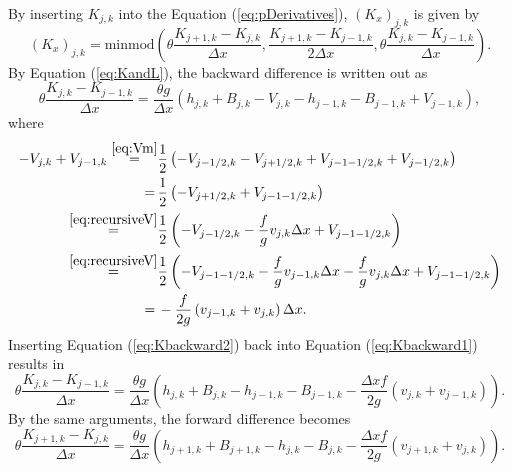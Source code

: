 \documentclass[11pt, a4paper]{article}
\newcommand{\dx}[0]{\Delta x}
\newcommand{\eref}[1]{Equation (\ref{eq:#1})}
\begin{document}
By inserting $K_{j,k}$ into the \eref{pDerivatives}, $(K_x)_{j,k}$ is given by
\begin{equation}
	\left( K_x \right)_{j,k} = \mathrm{minmod}\left( \theta \frac{K_{j+1, k} - K_{j,k}}{\dx}, 
										   		\frac{K_{j+1, k} - K_{j-1,k}}{2\dx},
										    	\theta \frac{K_{j, k} - K_{j-1,k}}{\dx}  \right).
	\label{eq:KDerivative}
\end{equation}
By \eref{KandL}, the backward difference is written out as 
\begin{equation}
	\theta \frac{K_{j,k} - K_{j-1,k}}{\dx}  = \frac{\theta g}{\dx} \left( h_{j,k} + B_{j,k} - V_{j,k} - h_{j-1,k} - B_{j-1,k} + V_{j-1,k} \right),
	\label{eq:Kbackward1}
\end{equation}
where
\begin{equation}
	\begin{split}
		- V_{j,k} + V_{j-1,k} 
		\overset{\eqref{eq:Vm}}{=}& \frac{1}{2}\left(-V_{j-1/2,k} - V_{j+1/2, k} + V_{j- 1 -1/2, k} + V_{j-1/2, k}  \right)\\
		=\,&  \frac{1}{2}\left(- V_{j+1/2, k} + V_{j- 1 -1/2, k} \right) \\
		\overset{\eqref{eq:recursiveV}}{=}& \frac{1}{2} \left( - V_{j-1/2, k} - \frac{f}{g}v_{j,k}\dx + V_{j- 1 -1/2, k} \right) \\
		\overset{\eqref{eq:recursiveV}}{=}& \frac{1}{2} \left( - V_{j-1-1/2, k} - \frac{f}{g}v_{j-1, k}\dx - \frac{f}{g}v_{j,k}\dx + V_{j- 1 -1/2, k} \right) \\
		=\,&  - \frac{f}{2g} \left(v_{j-1,k} + v_{j,k} \right) \dx.
	\end{split}
	\label{eq:Kbackward2}
\end{equation}
Inserting \eref{Kbackward2} back into \eref{Kbackward1} results in 
\begin{equation}
	\theta \frac{K_{j,k} - K_{j-1,k}}{\dx} = \frac{\theta g}{\dx}\left(h_{j,k} + B_{j,k} - h_{j-1,k} - B_{j-1,k} - \frac{\dx f}{2g} \left( v_{j,k} + v_{j-1,k} \right) \right).
	\label{eq:Kbackwards}
\end{equation}
By the same arguments, the forward difference becomes
\begin{equation}
	\theta \frac{K_{j+1,k} - K_{j,k}}{\dx} = \frac{\theta g}{\dx}\left(h_{j+1,k} + B_{j+1,k} - h_{j,k} - B_{j,k} - \frac{\dx f}{2g} \left( v_{j+1,k} + v_{j,k} \right) \right).
	\label{eq:Kforwards}
\end{equation}
\end{document}
